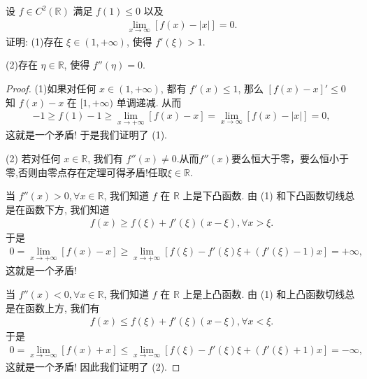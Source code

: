 \documentclass[../../main.tex]{subfiles}%
\begin{document}
\begin{example}
设 $f\in C^2(\mathbb{R})$ 满足 $f(1)\leqslant0$ 以及
\begin{align*}
\lim_{x\to\infty}[f(x)-|x|]=0.
\tag{12.27}
\end{align*}
证明:
(1)存在 $\xi\in(1,+\infty)$, 使得 $f'(\xi)>1$.

(2)存在 $\eta\in\mathbb{R}$, 使得 $f''(\eta)=0$.
\end{example}
\begin{proof}
(1)如果对任何 $x\in(1,+\infty)$, 都有 $f'(x)\leqslant1$, 那么 $[f(x)-x]'\leqslant0$ 知 $f(x)-x$ 在 $[1,+\infty)$ 单调递减. 从而
\begin{align*}
-1\geqslant f(1)-1\geqslant\lim_{x\to+\infty}[f(x)-x]=\lim_{x\to\infty}[f(x)-|x|]=0,
\end{align*}
这就是一个矛盾! 于是我们证明了 (1).

(2)
若对任何 $x\in\mathbb{R}$, 我们有 $f''(x)\neq0$.从而$f''(x)$要么恒大于零，要么恒小于零,否则由零点存在定理可得矛盾!任取$\xi \in \mathbb{R}$.

当 $f''(x)>0,\forall x\in\mathbb{R}$, 我们知道 $f$ 在 $\mathbb{R}$ 上是下凸函数. 由 (1) 和下凸函数切线总是在函数下方, 我们知道
\begin{align*}
f(x)\geqslant f(\xi)+f'(\xi)(x-\xi),\forall x>\xi.
\end{align*}
于是
\begin{align*}
0=\lim_{x\to+\infty}[f(x)-x]\geqslant\lim_{x\to+\infty}[f(\xi)-f'(\xi)\xi+(f'(\xi)-1)x]=+\infty,
\end{align*}
这就是一个矛盾!

当 $f''(x)<0,\forall x\in\mathbb{R}$, 我们知道 $f$ 在 $\mathbb{R}$ 上是上凸函数. 由 (1) 和上凸函数切线总是在函数上方, 我们有
\begin{align*}
f(x)\leqslant f(\xi)+f'(\xi)(x-\xi),\forall x<\xi.
\end{align*}
于是
\begin{align*}
0=\lim_{x\to-\infty}[f(x)+x]\leqslant\lim_{x\to-\infty}[f(\xi)-f'(\xi)\xi+(f'(\xi)+1)x]=-\infty,
\end{align*}
这就是一个矛盾! 因此我们证明了 (2). 
\end{proof}
\end{document}
